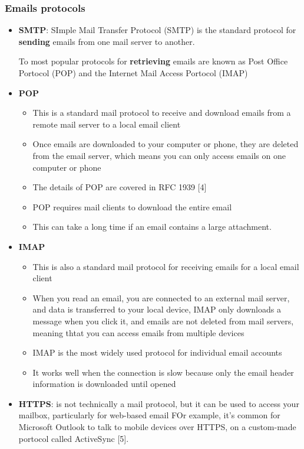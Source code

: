 \documentclass{report}
\theoremstyle{definition}
\let\oldsubsubsection\subsubsection
\renewcommand{\subsubsection}{\oldsubsubsection*}
\begin{document}
\subsubsection{Emails protocols}

\begin{itemize}
\item
\textbf{SMTP}: SImple Mail Transfer Protocol (SMTP) is the standard protocol for \textbf{sending} emails from one mail server to another.

To most popular protocols for \textbf{retrieving} emails are known as Post Office Portocol (POP) and the Internet Mail Access Portocol (IMAP)

\item
\textbf{POP}

\begin{itemize}
\item
This is a standard mail protocol to receive and download emails from a remote mail server to a local email client
\item
Once emails are downloaded to your computer or phone, they are deleted from the email server, which means you can only access emails on one computer or phone
\item
The details of POP are covered in RFC 1939 [4]
\item
POP requires mail clients to download the entire email
\item
This can take a long time if an email contains a large attachment.
\end{itemize}
\item
\textbf{IMAP}

\begin{itemize}
\item
This is also a standard mail protocol for receiving emails for a local email client
\item
When you read an email, you are connected to an external mail server, and data is transferred to your local device, IMAP only downloads a message when you click it, and emails are not deleted from mail servers, meaning thtat you can access emails from multiple devices
\item
IMAP is the most widely used protocol for individual email accounts
\item
It works well when the connection is slow because only the email header information is downloaded until opened
\end{itemize}

\item
\textbf{HTTPS}: is not technically a mail protocol, but it can be used to access your mailbox, particularly for web-based email FOr example, it's common for Microsoft Outlook to talk to mobile devices over HTTPS, on a custom-made portocol called ActiveSync [5].
\end{itemize}
\end{document}

